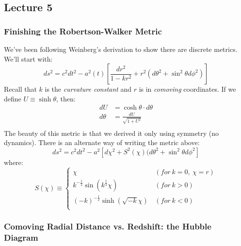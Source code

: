 \documentclass{article}
\def\hf{\frac12}
\def\hf{\frac12}
\begin{document}
\subsection{Lecture 5}

\subsubsection*{ Finishing the Robertson-Walker Metric}

We've been following Weinberg's derivation to show there are discrete metrics.
We'll start with:
$$ds^2=c^2dt^2-a^2(t)\left[\frac{dr^2}{ 1-kr^2}+r^2(d\theta^2+\sin^2\theta 
d\phi^2)\right]$$
Recall that $k$ is the {\it curvature constant} and $r$ is in {\it comoving}
coordinates.  If we define $U\equiv\sinh\theta$, then: 
\begin{align}
dU&=\cosh\theta\cdot d\theta\\
d\theta&=\frac{dU}{\sqrt{1+U^2}}\\
\end{align}
The beauty of this metric
is that we derived it only using symmetry (no dynamics).  There is an alternate
way of writing the metric above:
$$ds^2=c^2dt^2-a^2
\left[d\chi^2+S^2(\chi)(d\theta^2+\sin^2\theta d\phi^2\right]$$
where:
$$S(\chi)\equiv\begin{cases}\chi &\,(for\ k=0,\ \chi=r)\\
k^{-\hf}\sin(k^\hf \chi)&\,(for\ k>0)\\
(-k)^{-\hf}\sinh(\sqrt{-k}\chi)&\,(for\ k<0)\\\end{cases}$$
\par

\subsubsection*{ Comoving Radial Distance vs. Redshift: the Hubble Diagram }
\end{document}
